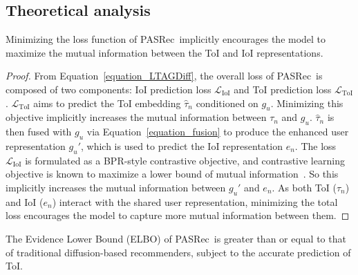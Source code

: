 \documentclass[sigconf,nonacm]{acmart}
\newcommand{\modelname}{PASRec}
\begin{document}
\subsection{Theoretical analysis}

\begin{proposition}
Minimizing the loss function of \modelname\ implicitly encourages the model to maximize the mutual information between the ToI and IoI representations.
\end{proposition}

\begin{proof}
From Equation~\ref{equation_LTAGDiff}, the overall loss of \modelname\ is composed of two components: IoI prediction loss $\mathcal{L}_{\text{IoI}}$ and ToI prediction loss $\mathcal{L}_{\text{ToI}}$. $\mathcal{L}_{\text{ToI}}$ aims to predict the ToI embedding $\hat{\tau}_n$ conditioned on ${g}_u$. Minimizing this objective implicitly increases the mutual information between $\tau_n$ and ${g}_u$. $\hat{\tau}_n$ is then fused with ${g}_u$ via Equation~\ref{equation_fusion} to produce the enhanced user representation ${g}_u'$, which is used to predict the IoI representation ${e}_n$. The loss $\mathcal{L}_{\text{IoI}}$ is formulated as a BPR-style contrastive objective, and contrastive learning objective is known to maximize a lower bound of mutual information~\cite{oord2018representation}. So this implicitly increases the mutual information between ${g}_u'$ and ${e}_n$. As both ToI ($\tau_n$) and IoI (${e}_n$) interact with the shared user representation, minimizing the total loss encourages the model to capture more mutual information between them.
\end{proof}

\begin{proposition}
The Evidence Lower Bound (ELBO) of \modelname\ is greater than or equal to that of traditional diffusion-based recommenders, subject to the accurate prediction of ToI.
\end{proposition}
\end{document}
